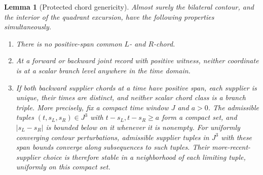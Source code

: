 \documentclass[11pt]{article}
\numberwithin{equation}{section}
\newtheorem{lemma}[theorem]{Lemma}
\theoremstyle{definition}
\theoremstyle{remark}
\newcommand{\1}{\mathbf 1}
\begin{document}
\begin{lemma}[Protected chord genericity]\label{enc:chord-genericity}
Almost surely the bilateral contour, and the interior of the quadrant
excursion, have the following properties simultaneously.
\begin{enumerate}[label=\textup{(\roman*)}]
\item There is no positive-span common $L$- and $R$-chord.
\item At a forward or backward joint record with positive witness,
neither coordinate is at a scalar branch level anywhere in the time
domain.
\item If both backward supplier chords at a time have positive span,
each supplier is unique, their times are distinct, and neither scalar
chord class is a branch triple.  More precisely, fix a compact time
window $J$ and $a>0$.  The admissible tuples
$(t,s_L,s_R)\in J^3$ with $t-s_L,t-s_R\ge a$ form a compact set,
and $|s_L-s_R|$ is bounded below on it whenever it is nonempty.
For uniformly converging contour perturbations, admissible supplier
tuples in $J^3$ with these span bounds converge along subsequences to
such tuples.  Their more-recent-supplier choice is therefore stable
in a neighborhood of each limiting tuple, uniformly on this compact set.
\end{enumerate}
\end{lemma}
\end{document}
